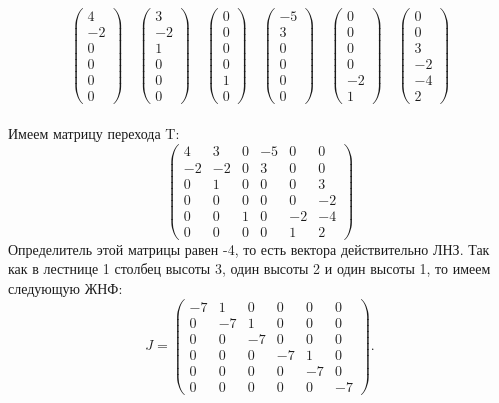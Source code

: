 \[
\begin{pmatrix}
4 \\ -2 \\ 0 \\ 0 \\ 0 \\ 0
\end{pmatrix}
\quad
\begin{pmatrix}
3 \\ -2 \\ 1 \\ 0 \\ 0 \\ 0
\end{pmatrix}
\quad
\begin{pmatrix}
0 \\ 0 \\ 0 \\ 0 \\ 1 \\ 0
\end{pmatrix}
\quad
\begin{pmatrix}
-5 \\ 3 \\ 0 \\ 0 \\ 0 \\ 0
\end{pmatrix}
\quad
\begin{pmatrix}
0 \\ 0 \\ 0 \\ 0 \\ -2 \\ 1
\end{pmatrix}
\quad
\begin{pmatrix}
0 \\ 0 \\ 3 \\ -2 \\ -4 \\ 2
\end{pmatrix}
\] \\
\noindent Имеем матрицу перехода T: \\
\[
\begin{pmatrix}
4 & 3 & 0 & -5 & 0 & 0 \\
-2 & -2 & 0 & 3 & 0 & 0 \\
0 & 1 & 0 & 0 & 0 & 3 \\
0 & 0 & 0 & 0 & 0 & -2 \\
0 & 0 & 1 & 0 & -2 & -4 \\
0 & 0 & 0 & 0 & 1 & 2
\end{pmatrix}
\]
\noindent Определитель этой матрицы равен -4, то есть вектора действительно ЛНЗ. Так как в лестнице 1 столбец высоты 3, один высоты 2 и один высоты 1, то имеем следующую ЖНФ: \\
 \[
     J = \begin{pmatrix}
     -7 & 1 & 0 & 0 & 0 & 0 \\
     0 & -7 & 1 & 0 & 0 & 0 \\
     0 & 0 & -7 & 0 & 0 & 0 \\
     0 & 0 & 0 & -7 & 1 & 0 \\
     0 & 0 & 0 & 0 & -7 & 0 \\
     0 & 0 & 0 & 0 & 0 & -7
     \end{pmatrix}.
     \]
